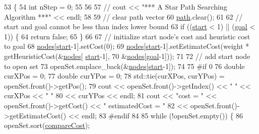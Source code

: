 \begin{DoxyCode}
53                                              \{
54     \textcolor{keywordtype}{int} nStep = 0;
55 
56 
57     \textcolor{comment}{// cout << "*** A Star Path Searching Algorithm ***" << endl;}
58 
59     \textcolor{comment}{// clear path vector}
60     \hyperlink{classPathFindingAlgorithm_ab177b2276cdf28fb77361bff19745b17}{path}.clear();
61 
62     \textcolor{comment}{// start and goal cannot be less than index lower bound}
63     \textcolor{keywordflow}{if} ((\hyperlink{classPathFindingAlgorithm_a1c31bd6b8c57459c32ada19cf9bf412a}{start} < 1) || (\hyperlink{classPathFindingAlgorithm_ae8acf41f92ba72a969a44640c99fb8a4}{goal} < 1)) \{
64         \textcolor{keywordflow}{return} \textcolor{keyword}{false};
65     \}
66 
67     \textcolor{comment}{// initialize start node's cost and heuristic cost to goal}
68     \hyperlink{classPathFindingAlgorithm_a3405321350d5fb10ba367c47944a7b77}{nodes}[\hyperlink{classPathFindingAlgorithm_a1c31bd6b8c57459c32ada19cf9bf412a}{start}-1].setCost(0);
69     \hyperlink{classPathFindingAlgorithm_a3405321350d5fb10ba367c47944a7b77}{nodes}[\hyperlink{classPathFindingAlgorithm_a1c31bd6b8c57459c32ada19cf9bf412a}{start}-1].setEstimateCost(weight * getHeuristicCost(&\hyperlink{classPathFindingAlgorithm_a3405321350d5fb10ba367c47944a7b77}{nodes}[
      \hyperlink{classPathFindingAlgorithm_a1c31bd6b8c57459c32ada19cf9bf412a}{start}-1],
70                                    &\hyperlink{classPathFindingAlgorithm_a3405321350d5fb10ba367c47944a7b77}{nodes}[\hyperlink{classPathFindingAlgorithm_ae8acf41f92ba72a969a44640c99fb8a4}{goal}-1]));
71 
72     \textcolor{comment}{// add start node to open set}
73     openSet.emplace\_back(&\hyperlink{classPathFindingAlgorithm_a3405321350d5fb10ba367c47944a7b77}{nodes}[\hyperlink{classPathFindingAlgorithm_a1c31bd6b8c57459c32ada19cf9bf412a}{start}-1]);
74 
75 \textcolor{preprocessor}{#if 0}
76 \textcolor{preprocessor}{}    \textcolor{keywordtype}{double} curXPos = 0;
77     \textcolor{keywordtype}{double} curYPos = 0;
78     std::tie(curXPos, curYPos) = openSet.front()->getPos();
79     cout << openSet.front()->getIndex() << \textcolor{stringliteral}{" "} << curXPos << \textcolor{stringliteral}{" "}
80          << curYPos << endl;
81     cout << \textcolor{stringliteral}{"cost = "} << openSet.front()->getCost() << \textcolor{stringliteral}{" estimatedCost = "}
82          << openSet.front()->getEstimateCost() << endl;
83 \textcolor{preprocessor}{#endif}
84 \textcolor{preprocessor}{}
85     \textcolor{keywordflow}{while} (!openSet.empty()) \{
86         openSet.sort(\hyperlink{AStarAlgorithm_8cpp_a9941f2d9671bce063d16ba2ecd046d6a}{compareCost});

\end{DoxyCode}
